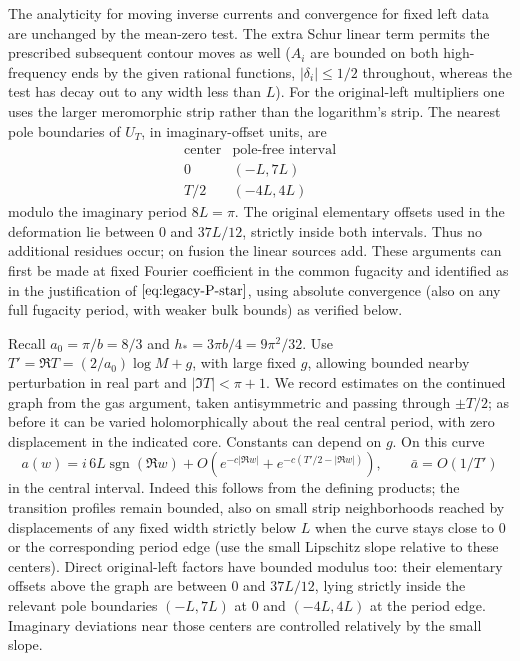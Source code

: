 The analyticity for moving inverse currents and convergence for fixed left data are unchanged by the mean-zero test. The extra Schur linear term permits the prescribed subsequent contour moves as well (\(A_i\) are bounded on both high-frequency ends by the given rational functions, \(|\delta_i|\le1/2\) throughout, whereas the test has decay out to any width less than \(L\)). For the original-left multipliers one uses the larger meromorphic strip rather than the logarithm's strip. The nearest pole boundaries of \(U_T\), in imaginary-offset units, are
\[
 \begin{array}{c|c}
 \text{center}&\text{pole-free interval}\\\hline
 0&(-L,7L)\\
 T/2&(-4L,4L)
 \end{array}
\]
modulo the imaginary period \(8L=\pi\). The original elementary offsets used in the deformation lie between 0 and \(37L/12\), strictly inside both intervals. Thus no additional residues occur; on fusion the linear sources add. These arguments can first be made at fixed Fourier coefficient in the common fugacity and identified as in the justification of \(\eqref{eq:legacy-P-star}\), using absolute convergence (also on any full fugacity period, with weaker bulk bounds) as verified below.

Recall \(a_0=\pi/b=8/3\) and \(h_*=3\pi b/4=9\pi^2/32\). Use \(T'=\Re T=(2/a_0)\log M+g\), with large fixed \(g\), allowing bounded nearby perturbation in real part and \(|\Im T|<\pi+1\). We record estimates on the continued graph from the gas argument, taken antisymmetric and passing through \(\pm T/2\); as before it can be varied holomorphically about the real central period, with zero displacement in the indicated core. Constants can depend on \(g\). On this curve
\[
 a(w)=i\,6L\operatorname{sgn}(\Re w)
   + O(e^{-c|\Re w|}+e^{-c(T'/2-|\Re w|)}) ,
 \qquad \bar a=O(1/T')
\]
in the central interval. Indeed this follows from the defining products; the transition profiles remain bounded, also on small strip neighborhoods reached by displacements of any fixed width strictly below \(L\) when the curve stays close to 0 or the corresponding period edge (use the small Lipschitz slope relative to these centers). Direct original-left factors have bounded modulus too: their elementary offsets above the graph are between 0 and \(37L/12\), lying strictly inside the relevant pole boundaries \((-L,7L)\) at 0 and \((-4L,4L)\) at the period edge. Imaginary deviations near those centers are controlled relatively by the small slope.


